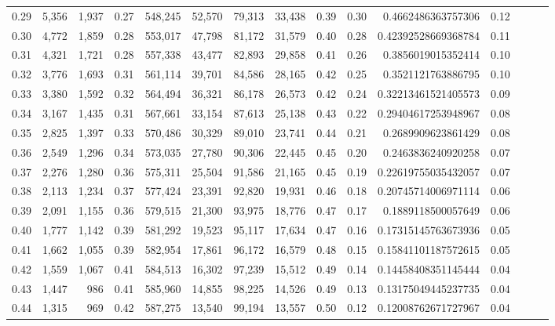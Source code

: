 \begin{tabular}{rrrrrrrrrrrrrrr}
0.29 &   5,356 &  1,937 &  0.27 &  548,245 &   52,570 &   79,313 &   33,438 &  0.39 &  0.30 &      0.4662486363757306 &      0.12 \\
0.30 &   4,772 &  1,859 &  0.28 &  553,017 &   47,798 &   81,172 &   31,579 &  0.40 &  0.28 &     0.42392528669368784 &      0.11 \\
0.31 &   4,321 &  1,721 &  0.28 &  557,338 &   43,477 &   82,893 &   29,858 &  0.41 &  0.26 &      0.3856019015352414 &      0.10 \\
0.32 &   3,776 &  1,693 &  0.31 &  561,114 &   39,701 &   84,586 &   28,165 &  0.42 &  0.25 &      0.3521121763886795 &      0.10 \\
0.33 &   3,380 &  1,592 &  0.32 &  564,494 &   36,321 &   86,178 &   26,573 &  0.42 &  0.24 &     0.32213461521405573 &      0.09 \\
0.34 &   3,167 &  1,435 &  0.31 &  567,661 &   33,154 &   87,613 &   25,138 &  0.43 &  0.22 &     0.29404617253948967 &      0.08 \\
0.35 &   2,825 &  1,397 &  0.33 &  570,486 &   30,329 &   89,010 &   23,741 &  0.44 &  0.21 &      0.2689909623861429 &      0.08 \\
0.36 &   2,549 &  1,296 &  0.34 &  573,035 &   27,780 &   90,306 &   22,445 &  0.45 &  0.20 &      0.2463836240920258 &      0.07 \\
0.37 &   2,276 &  1,280 &  0.36 &  575,311 &   25,504 &   91,586 &   21,165 &  0.45 &  0.19 &     0.22619755035432057 &      0.07 \\
0.38 &   2,113 &  1,234 &  0.37 &  577,424 &   23,391 &   92,820 &   19,931 &  0.46 &  0.18 &     0.20745714006971114 &      0.06 \\
0.39 &   2,091 &  1,155 &  0.36 &  579,515 &   21,300 &   93,975 &   18,776 &  0.47 &  0.17 &      0.1889118500057649 &      0.06 \\
0.40 &   1,777 &  1,142 &  0.39 &  581,292 &   19,523 &   95,117 &   17,634 &  0.47 &  0.16 &     0.17315145763673936 &      0.05 \\
0.41 &   1,662 &  1,055 &  0.39 &  582,954 &   17,861 &   96,172 &   16,579 &  0.48 &  0.15 &     0.15841101187572615 &      0.05 \\
0.42 &   1,559 &  1,067 &  0.41 &  584,513 &   16,302 &   97,239 &   15,512 &  0.49 &  0.14 &     0.14458408351145444 &      0.04 \\
0.43 &   1,447 &    986 &  0.41 &  585,960 &   14,855 &   98,225 &   14,526 &  0.49 &  0.13 &     0.13175049445237735 &      0.04 \\
0.44 &   1,315 &    969 &  0.42 &  587,275 &   13,540 &   99,194 &   13,557 &  0.50 &  0.12 &     0.12008762671727967 &      0.04 \\

\end{tabular}

